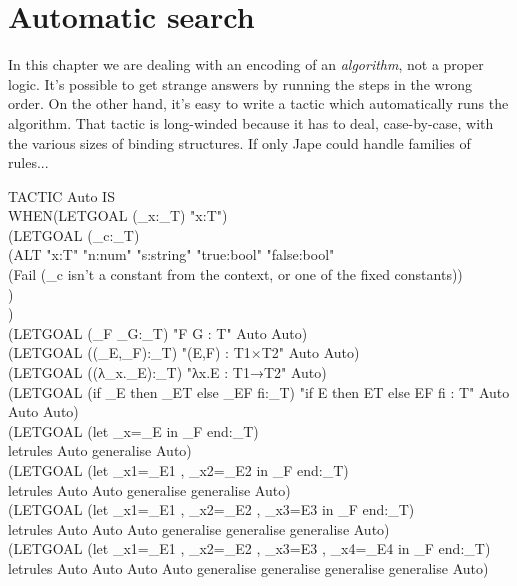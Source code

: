 \section{Automatic search}

In this chapter we are dealing with an encoding of an \textit{algorithm}, not a proper logic. It's possible to get strange answers by running the steps in the wrong order. On the other hand, it's easy to write a tactic which automatically runs the algorithm. That tactic is long-winded because it has to deal, case-by-case, with the various sizes of binding structures. If only Jape could handle families of rules...

\begin{japeish}
TACTIC Auto IS  \\
\tab WHEN\tab (LETGOAL (\_x:\_T) "x:T") \\
\tab \tab (LETGOAL (\_c:\_T)  \\
\tab \tab \tab (ALT "x:T" "n:num" "s:string" "true:bool" "false:bool" \\
\tab \tab \tab \tab (Fail (\_c isn't a constant from the context, or one of the fixed constants)) \\
\tab \tab \tab ) \\
\tab \tab ) \\
\tab \tab (LETGOAL (\_F \_G:\_T) "F G : T" Auto Auto) \\
\tab \tab (LETGOAL ((\_E,\_F):\_T) "(E,F) : T1×T2" Auto Auto) \\
\tab \tab (LETGOAL ((λ\_x.\_E):\_T) "λx.E : T1→T2" Auto) \\
\tab \tab (LETGOAL (if \_E then \_ET else \_EF fi:\_T) "if E then ET else EF fi : T" Auto Auto Auto) \\
\tab \tab (LETGOAL (let \_x=\_E in \_F end:\_T)  \\
\tab \tab \tab letrules Auto generalise Auto) \\
\tab \tab (LETGOAL (let \_x1=\_E1 , \_x2=\_E2 in \_F end:\_T)  \\
\tab \tab \tab letrules Auto Auto generalise generalise Auto) \\
\tab \tab (LETGOAL (let \_x1=\_E1 , \_x2=\_E2 , \_x3=E3 in \_F end:\_T)  \\
\tab \tab \tab letrules Auto Auto Auto generalise generalise generalise Auto) \\
\tab \tab (LETGOAL (let \_x1=\_E1 , \_x2=\_E2 , \_x3=E3 , \_x4=\_E4 in \_F end:\_T)  \\
\tab \tab \tab letrules Auto Auto Auto Auto generalise generalise generalise generalise Auto) \\

\end{japeish}
